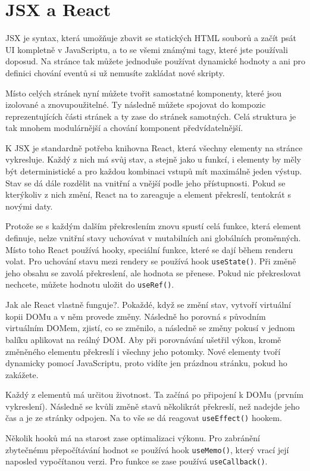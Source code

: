 \section{JSX a React}

JSX je syntax, která umožňuje zbavit se statických HTML souborů a začít psát UI kompletně v JavaScriptu, a to se všemi známými tagy, které jste používali doposud.\cite{JSX} Na stránce tak můžete jednoduše používat dynamické hodnoty a ani pro definici chování eventů si už nemusíte zakládat nové skripty.

Místo celých stránek nyní můžete tvořit samostatné komponenty, které jsou izolované a znovupoužitelné. Ty následně můžete spojovat do kompozic reprezentujících části stránek a ty zase do stránek samotných. Celá struktura je tak mnohem modulárnější a chování komponent předvídatelnější.

K JSX je standardně potřeba knihovna React, která všechny elementy na stránce vykresluje. Každý z nich má svůj stav, a stejně jako u funkcí, i elementy by měly být deterministické a pro každou kombinaci vstupů mít maximálně jeden výstup. Stav se dá dále rozdělit na vnitřní a vnější podle jeho přístupnosti. Pokud se kterýkoliv z nich změní, React na to zareaguje a element překreslí, tentokrát s novými daty.

Protože se s každým dalším překreslením znovu spustí celá funkce, která element definuje, nelze vnitřní stavy uchovávat v mutabilních ani globálních proměnných.\cite{ReactState} Místo toho React používá hooky, speciální funkce, které se dají během renderu volat. Pro uchování stavu mezi rendery se používá hook \texttt{useState()}. Při změně jeho obsahu se zavolá překreslení, ale hodnota se přenese. Pokud nic překreslovat nechcete, můžete hodnotu uložit do \texttt{useRef()}\cite{UseRef}.

Jak ale React vlastně funguje?\cite{ReactDeepDive}. Pokaždé, když se změní stav, vytvoří virtuální kopii DOMu a v něm provede změny.\cite{VirtualDOM} Následně ho porovná s původním virtuálním DOMem, zjistí, co se změnilo, a následně se změny pokusí v jednom balíku aplikovat na reálný DOM. Aby při porovnávání ušetřil výkon, kromě změněného elementu překreslí i všechny jeho potomky. Nové elementy tvoří dynamicky pomocí JavaScriptu, proto vidíte jen prázdnou stránku, pokud ho zakážete. 

Každý z elementů má určitou životnost. Ta začíná po připojení k DOMu (prvním vykreslení). Následně se kvůli změně stavů několikrát překreslí, než nadejde jeho čas a je ze stránky odpojen. Na to vše se dá reagovat \texttt{useEffect()} hookem.

Několik hooků má na starost zase optimalizaci výkonu. Pro zabránění zbytečnému přepočítávání hodnot se používá hook \texttt{useMemo()}, který vrací její naposled vypočítanou verzi. Pro funkce se zase používá \texttt{useCallback()}.